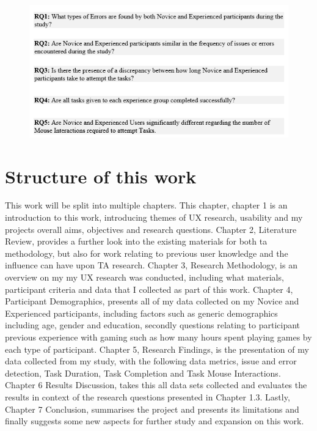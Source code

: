 \begin{figure}[H]
    \centering
    \includegraphics{Screenshots/rqxUpdated.png}
\end{figure}



\section{Structure of this work}
This work will be split into multiple chapters. This chapter, chapter 1 is an introduction to this work, introducing themes of UX research, usability and my projects overall aims, objectives and research questions. Chapter 2, Literature Review, provides a further look into the existing materials for both \gls{ta} methodology, but also for work relating to previous user knowledge and the influence can have upon TA research. Chapter 3, Research Methodology, is an overview on my my UX research was conducted, including what materials, participant criteria and data that I collected as part of this work. Chapter 4, Participant Demographics, presents all of my data collected on my Novice and Experienced participants, including factors such as generic demographics including age, gender and education, secondly questions relating to participant previous experience with gaming such as how many hours spent playing games by each type of participant. Chapter 5, Research Findings, is the presentation of my data collected from my study, with the following data metrics, issue and error detection, Task Duration, Task Completion and Task Mouse Interactions. Chapter 6 Results Discussion, takes this all data sets collected and evaluates the results in context of the research questions presented in Chapter 1.3. Lastly, Chapter 7 Conclusion, summarises the project and presents its limitations and finally suggests some new aspects for further study and expansion on this work.


